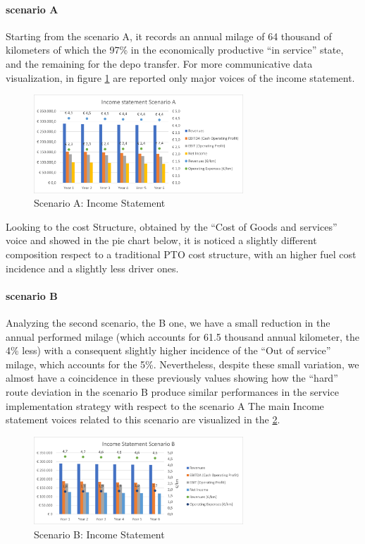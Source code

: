 \paragraph{scenario A}
Starting from the scenario A, it records an annual milage of 64 thousand of kilometers of which the 97\% in the economically productive “in service” state, and the remaining for the depo transfer. For more communicative data visualization, in figure \ref{fig:incstateA} are reported only major voices of the income statement.

\begin{figure}[h]
    \centering
    \includegraphics[width=0.7\textwidth]{Images/financial/income_statement_A.png}
    \caption{Scenario A: Income Statement}
    \label{fig:incstateA}
\end{figure}

Looking to the cost Structure, obtained by the “Cost of Goods and services” voice and showed in the pie chart below, it is noticed a slightly different composition respect to a traditional PTO cost structure, with an higher fuel cost incidence and a slightly less driver ones. 

\paragraph{scenario B}
Analyzing the second scenario, the B one, we have a small reduction in the annual performed milage (which accounts for 61.5 thousand annual kilometer, the 4\% less) with a consequent slightly higher incidence of the “Out of service” milage, which accounts for the 5\%. Nevertheless, despite these small variation, we almost have a coincidence in these previously values showing how the “hard” route deviation in the scenario B produce similar performances in the service implementation strategy with respect to the scenario A
The main Income statement voices related to this scenario are visualized in the \ref{fig:incstateB}.

\begin{figure}[h]
    \centering
    \includegraphics[width=0.7\textwidth]{Images/financial/income_statement_B.png}
    \caption{Scenario B: Income Statement}
    \label{fig:incstateB}
\end{figure}

